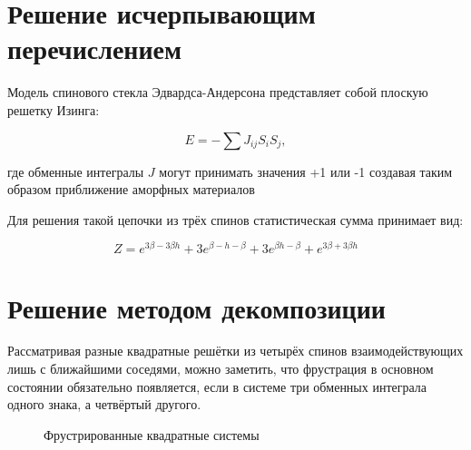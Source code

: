 \documentclass[utf8, babel, sor, jor, amsmath, amssymb, reprint]{elsarticle} %
\begin{document}
\section{Решение исчерпывающим перечислением}

Модель спинового стекла Эдвардса-Андерсона представляет собой плоскую решетку Изинга:

\begin{equation}
	E = -\sum J_{ij} S_i S_j,
	\label{eq:ising_energy}
\end{equation}

 где обменные интегралы $J$ могут принимать значения +1 или -1 создавая таким образом приближение аморфных материалов

Для решения такой цепочки из трёх спинов статистическая сумма
принимает вид:

\begin{equation}
	Z = e^{3\beta - 3\beta h} + 3e^{\beta - h - \beta} + 3e^{\beta h - \beta} + e^{3\beta + 3\beta h}
	\label{eq:stat_3}
\end{equation}

\section{Решение методом декомпозиции}

Рассматривая разные квадратные решётки из четырёх спинов взаимодействующих лишь с ближайшими соседями, можно заметить, что фрустрация в основном состоянии обязательно появляется, если в системе три обменных интеграла одного знака, а четвёртый другого.

\begin{figure}[h]
	\centering
	\caption{Фрустрированные квадратные системы}
	\label{fig:label}
\end{figure}
\end{document}
